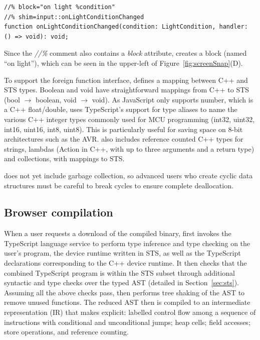 \begin{lstlisting}
//% block="on light %condition"
//% shim=input::onLightConditionChanged
function onLightConditionChanged(condition: LightCondition, handler: () => void): void;
\end{lstlisting}

Since the \emph{//\%} comment also contains a \emph{block} attribute, \MC creates a block (named ``on light''), which can be seen in the upper-left of Figure~\ref{fig:screenSnap}(D).

To support the foreign function interface, \MC defines a mapping between C++ and STS types.
Boolean and void have straightforward mappings from C++ to STS (bool $\rightarrow$ boolean, void $\rightarrow$ void).
As JavaScript only supports number, which is a C++ float/double, \MC uses TypeScript's support
for type aliases to name the various C++ integer types commonly used for MCU programming
(int32, uint32, int16, uint16, int8, uint8).
This is particularly useful for saving space on 8-bit architectures such as the AVR.
\MC also includes reference counted C++ types for strings, lambdas (Action in C++, with
up to three arguments and a return type) and collections, with mappings to STS.

\MC does not yet include garbage collection, so advanced users who create cyclic
data structures must be careful to break cycles to ensure complete deallocation.

\subsection{Browser compilation}

When a user requests a download of the compiled binary, \MC first invokes the TypeScript language service to perform type inference and type checking on the
user's program, the device runtime written in STS, as well as the TypeScript declarations
corresponding to the C++ device runtime. It then checks that the
combined TypeScript program is within the STS subset through additional syntactic and type checks over the typed AST (detailed in Section~\ref{sec:sts}).  Assuming all the
above checks pass, \MC then performs tree shaking of the AST to remove unused functions.
The reduced AST then is compiled to an intermediate representation (IR) that makes explicit: labelled control
flow among a sequence of instructions with conditional and unconditional jumps; heap cells; field accesses; store operations,
and reference counting.

